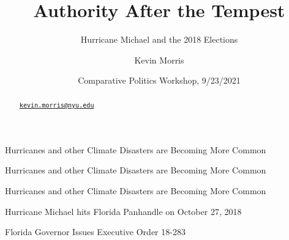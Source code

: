 \documentclass[
  ignorenonframetext,
  aspectratio=169]{beamer}
\title{Authority After the Tempest}
\subtitle{Hurricane Michael and the 2018 Elections}
\author{Kevin Morris}
\date{Comparative Politics Workshop, 9/23/2021}
\institute{Brennan Center for Justice / CUNY Graduate Center, Sociology}
\begin{document}
\frame{\titlepage}
\begin{abstract}
\href{mailto:kevin.morris@nyu.edu}{\nolinkurl{kevin.morris@nyu.edu}}
\end{abstract}

\begin{frame}{Hurricanes and other Climate Disasters are Becoming More
Common}
\protect\hypertarget{hurricanes-and-other-climate-disasters-are-becoming-more-common}{}
\end{frame}

\begin{frame}{Hurricanes and other Climate Disasters are Becoming More
Common}
\protect\hypertarget{hurricanes-and-other-climate-disasters-are-becoming-more-common-1}{}
\end{frame}

\begin{frame}{Hurricanes and other Climate Disasters are Becoming More
Common}
\protect\hypertarget{hurricanes-and-other-climate-disasters-are-becoming-more-common-2}{}
\end{frame}

\begin{frame}{Hurricane Michael hits Florida Panhandle on October 27,
2018}
\protect\hypertarget{hurricane-michael-hits-florida-panhandle-on-october-27-2018}{}
\end{frame}

\begin{frame}{Florida Governor Issues Executive Order 18-283}
\protect\hypertarget{florida-governor-issues-executive-order-18-283}{}
\end{frame}
\end{document}
